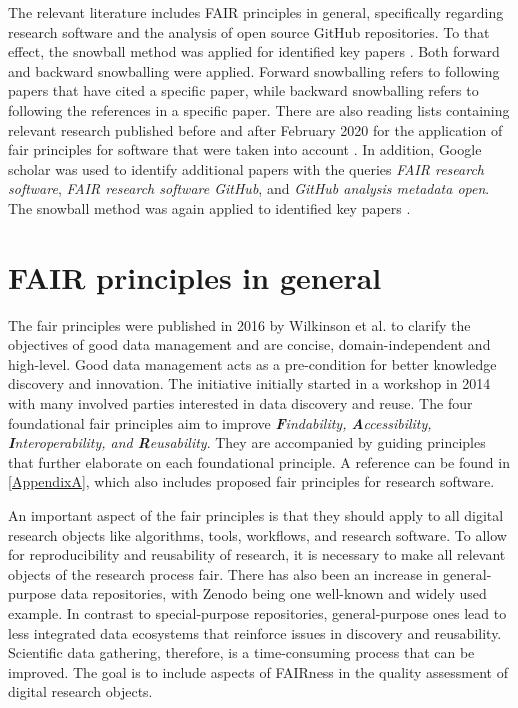 The relevant literature includes FAIR principles in general, specifically regarding research software and the analysis of open source GitHub repositories. To that effect, the snowball method \cite{wohlin_guidelines_2014} was applied for identified key papers \cite{lamprecht_towards_2020, wilkinson_fair_2016, katz_fair4rs_2021-1}. Both forward and backward snowballing were applied. Forward snowballing refers to following papers that have cited a specific paper, while backward snowballing refers to following the references in a specific paper. There are also reading lists containing relevant research published before and after February 2020 for the application of \acrshort{fair} principles for software that were taken into account \cite{noauthor_fair4software_2020, wg_fair4rs_2021}.
In addition, Google scholar was used to identify additional papers with the queries \textit{FAIR research software}, \textit{FAIR research software GitHub}, and \textit{GitHub analysis metadata open}. The snowball method was again applied to identified key papers \cite{hasselbring_open_2020}. 

\section{FAIR principles in general}
\label{sec:lit_fairgeneral}
The \acrshort{fair} principles were published in 2016 by Wilkinson et al. \cite{wilkinson_fair_2016} to clarify the objectives of good data management and are concise, domain-independent and high-level. Good data management acts as a pre-condition for better knowledge discovery and innovation. The initiative initially started in a workshop in 2014 with many involved parties interested in data discovery and reuse. 
The four foundational \acrshort{fair} principles aim to improve \textit{\textbf{F}indability, \textbf{A}ccessibility, \textbf{I}nteroperability, and \textbf{R}eusability}. They are accompanied by guiding principles that further elaborate on each foundational principle. A reference can be found in \autoref{AppendixA}, which also includes proposed \acrshort{fair} principles for research software.


An important aspect of the \acrshort{fair} principles is that they should apply to all digital research objects like algorithms, tools, workflows, and research software. To allow for reproducibility and reusability of research, it is necessary to make all relevant objects of the research process \acrshort{fair}. There has also been an increase in general-purpose data repositories, with Zenodo \cite{zenodo} being one well-known and widely used example. In contrast to special-purpose repositories, general-purpose ones lead to less integrated data ecosystems that reinforce issues in discovery and reusability. Scientific data gathering, therefore, is a time-consuming process that can be improved. The goal is to include aspects of FAIRness in the quality assessment of digital research objects.

